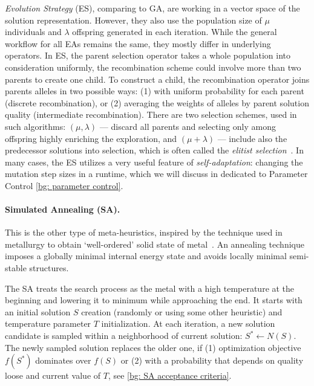 \emph{Evolution Strategy} (ES), comparing to GA, are working in a vector space of the solution representation. However, they also use the population size of $\mu$ individuals and $\lambda$ offspring generated in each iteration. While the general workflow for all EAs remains the same, they mostly differ in underlying operators. In ES, the parent selection operator takes a whole population into consideration uniformly, the recombination scheme could involve more than two parents to create one child. To construct a child, the recombination operator joins parents alleles in two possible ways: (1) with uniform probability for each parent (discrete recombination), or (2) averaging the weights of alleles by parent solution quality (intermediate recombination). There are two selection schemes, used in such algorithms: $(\mu,\lambda)$ — discard all parents and selecting only among offspring highly enriching the exploration, and $(\mu+\lambda)$ — include also the predecessor solutions into selection, which is often called the \textit{elitist selection}~\cite{eiben2015popular}. In many cases, the ES utilizes a very useful feature of \emph{self-adaptation}: changing the mutation step sizes in a runtime, which we will discuss in dedicated to Parameter Control \cref{bg: parameter control}.

\paragraph{Simulated Annealing (SA).} This is the other type of meta-heuristics, inspired by the technique used in metallurgy to obtain `well-ordered' solid state of metal~\cite{van1987simulated}. An annealing technique imposes a globally minimal internal energy state and avoids locally minimal semi-stable structures. 

The SA treats the search process as the metal with a high temperature at the beginning and lowering it to minimum while approaching the end. %
It starts with an initial solution $S$ creation (randomly or using some other heuristic) and temperature parameter $T$ initialization. At each iteration, a new solution candidate is sampled within a neighborhood of current solution: $S^* \leftarrow N(S)$. The newly sampled solution replaces the older one, if (1) optimization objective $f(S^*)$ dominates over $f(S)$ or (2) with a probability that depends on quality loose and current value of $T$, see \cref{bg: SA acceptance criteria}.

